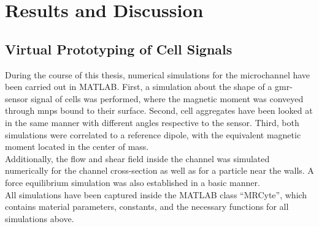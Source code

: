 \chapter{Results and Discussion}
\section{Virtual Prototyping of Cell Signals}
\label{sec:res:simMag}
During the course of this thesis, numerical simulations for the microchannel have been carried out in MATLAB. First, a simulation about the shape of a \gls{gmr}-sensor signal of cells was performed, where the magnetic moment was conveyed through \glspl{mnp} bound to their surface. Second, cell aggregates have been looked at in the same manner with different angles respective to the sensor. Third, both simulations were correlated to a reference dipole, with the equivalent magnetic moment located in the center of mass.\\
Additionally, the flow and shear field inside the channel was simulated numerically for the channel cross-section as well as for a particle near the walls. A force equilibrium simulation was also established in a basic manner. \\
All simulations have been captured inside the MATLAB class ``MRCyte'', which contains material parameters, constants, and the necessary functions for all simulations above.
